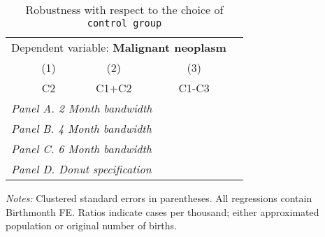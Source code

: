  \begin{table}[H] \begin{threeparttable} \centering \caption{Robustness with respect to the choice of \texttt{control group}} {\def\sym#1{\ifmmode^{#1}\else\(^{#1}\)\fi} \begin{tabular}{l*{4}{c}} \toprule \multicolumn{4}{c}{Dependent variable: \textbf{Malignant neoplasm}} \\ \cmidrule(lr){2-4}
            &\multicolumn{1}{c}{(1)}&\multicolumn{1}{c}{(2)}&\multicolumn{1}{c}{(3)}\\
            &\multicolumn{1}{c}{C2}&\multicolumn{1}{c}{C1+C2}&\multicolumn{1}{c}{C1-C3}\\
\midrule
 \multicolumn{4}{l}{\emph{Panel A. 2 Month bandwidth}} \\    \midrule\multicolumn{4}{l}{\emph{Panel B. 4 Month bandwidth}} \\    \midrule\multicolumn{4}{l}{\emph{Panel C. 6 Month bandwidth}} \\    \midrule\multicolumn{4}{l}{\emph{Panel D. Donut specification}} \\    
\bottomrule \end{tabular} } \begin{tablenotes} \item \scriptsize \emph{Notes:} Clustered standard errors in parentheses. All regressions contain Birthmonth FE. Ratios indicate cases per thousand; either approximated population or original number of births. \end{tablenotes} \end{threeparttable} \end{table} 
